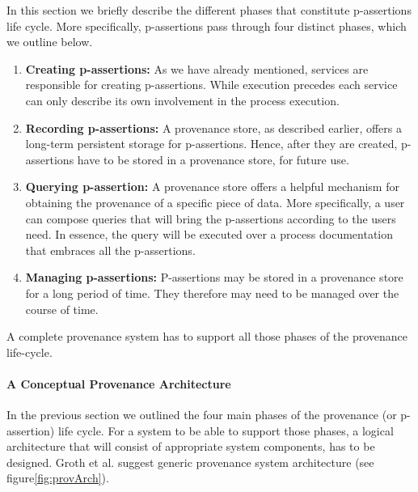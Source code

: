 In this section we briefly describe the different phases that constitute p-assertions life cycle\cite{reference10}. More specifically, p-assertions pass through four distinct phases, which we outline below.
\begin{enumerate}
  \item
        \textbf{Creating p-assertions:} As we have already mentioned, services are responsible for creating p-assertions. While execution precedes each service can only describe its own involvement in the process execution.
  \item
        \textbf{Recording p-assertions:} A provenance store, as described earlier, offers a long-term persistent storage for p-assertions. Hence, after they are created, p-assertions have to be stored in a provenance store, for future use.
  \item
        \textbf{Querying p-assertion:} A provenance store offers a helpful mechanism for obtaining the provenance of a specific piece of data. More specifically, a user can compose queries that will bring the p-assertions according to the users need. In essence, the query will be executed over a process documentation that embraces all the p-assertions.
  \item
        \textbf{Managing p-assertions:} P-assertions may be stored in a provenance store for a long period of time. They therefore may need to be managed over the course of time.
\end{enumerate}

A complete provenance system has to support all those phases of the provenance life-cycle.

\paragraph{A Conceptual Provenance Architecture}

In the previous section we outlined the four main phases of the provenance (or p-assertion) life cycle. For a system to be able to support those phases, a logical architecture that will consist of appropriate system components, has to be designed. Groth et al.\cite{reference10} suggest generic provenance system architecture (see figure\ref{fig:provArch}).


